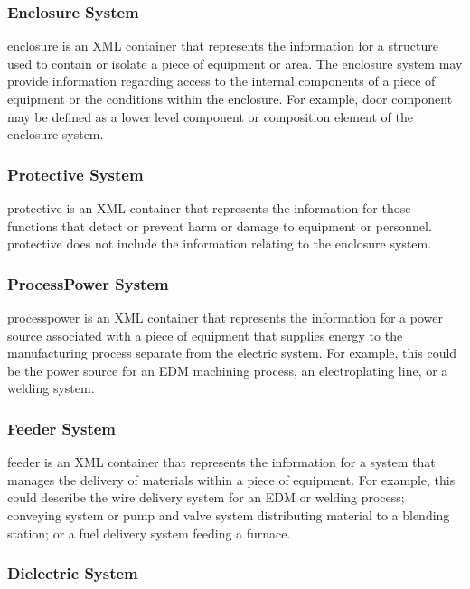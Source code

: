 \documentclass{mtconnect}	%
\begin{document}
\subsubsection{Enclosure System}

\gls{enclosure} is an XML container that represents the information for a structure used to contain or isolate a piece of equipment or area.  The \gls{enclosure} system may provide information regarding access to the internal components of a piece of equipment or the conditions within the enclosure.   For example, \gls{door component} may be defined as a \gls{lower level} \gls{component} or \gls{composition} element of the \gls{enclosure} system.

\subsubsection{Protective System}

\gls{protective} is an XML container that represents the information for those functions that detect or prevent harm or damage to equipment or personnel.  \gls{protective} does not include the information relating to the \gls{enclosure} system.

\subsubsection{ProcessPower System}

\gls{processpower} is an XML container that represents the information for a power source associated with a piece of equipment that supplies energy to the manufacturing process separate from the \gls{electric} system.  For example, this could be the power source for an EDM machining process, an electroplating line, or a welding system.  

\subsubsection{Feeder System}

\gls{feeder} is an XML container that represents the information for a system that manages the delivery of materials within a piece of equipment.   For example, this could describe the wire delivery system for an EDM or welding process; conveying system or pump and valve system distributing material to a blending station; or a fuel delivery system feeding a furnace.  

\subsubsection{Dielectric System}
\end{document}
